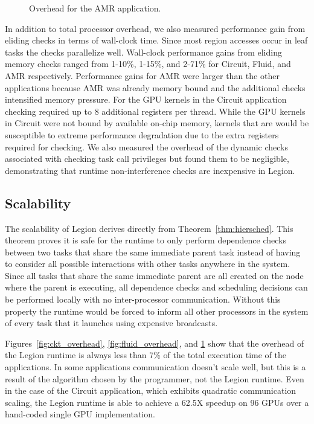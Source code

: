 \begin{figure}
\begin{center}
{\label{fig:amr16384}
}
\end{center}
\vspace{-2mm}
\caption{Overhead for the AMR application.\label{fig:amr_overhead}}
\vspace{-6mm}
\end{figure}

In addition to total processor overhead, we also measured performance gain from eliding checks in 
terms of wall-clock time.  Since most region accesses occur in leaf tasks the checks parallelize 
well.  Wall-clock performance gains from eliding memory checks ranged from 1-10\%, 1-15\%, 
and 2-71\% for Circuit, Fluid, and AMR respectively.  Performance gains for AMR were larger than
the other applications because AMR was already memory bound and the additional checks intensified
memory pressure.  For the GPU kernels in the Circuit application checking required up to 8 additional 
registers per thread.  While the GPU kernels in Circuit were not bound by 
available on-chip memory, kernels that are would be susceptible to extreme performance 
degradation due to the extra registers required for checking.  We also measured the overhead
of the dynamic checks associated with checking task call privileges but found them to be negligible,
demonstrating that runtime non-interference checks are inexpensive in Legion.

\subsection{Scalability}
\label{subsec:scalability}
The scalability of Legion derives directly from Theorem~\ref{thm:hiersched}.  This 
theorem proves it is safe for the runtime to only perform dependence checks between two
tasks that share the same immediate parent task instead of having to consider all
possible interactions with other tasks anywhere in the system.  Since all tasks that
share the same immediate parent are all created on the node where the parent is executing,
all dependence checks and scheduling decisions can be performed locally with no inter-processor communication.  
Without this property the runtime would be forced to inform all other processors in the system 
of every task that it launches using expensive broadcasts. 

Figures~\ref{fig:ckt_overhead}, \ref{fig:fluid_overhead}, and \ref{fig:amr_overhead} show that
the overhead of the Legion runtime is always less than 7\% of the total execution time
of the applications.  In some applications communication doesn't scale well, but this is
a result of the algorithm chosen by the programmer, not the Legion runtime.
Even in the case of the Circuit application, which exhibits quadratic communication scaling, the Legion
runtime is able to achieve a 62.5X speedup on 96 GPUs over a hand-coded single GPU implementation\cite{Legion12}.

